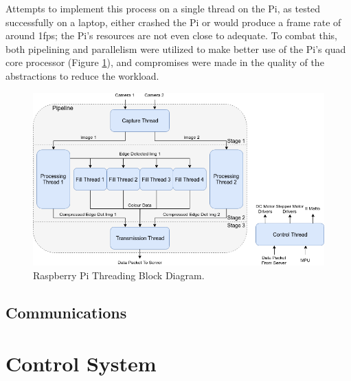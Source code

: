Attempts to implement this process on a single thread on the Pi, as tested successfully on a laptop, either crashed the Pi or would produce a frame rate of around 1fps; the Pi's resources are not even close to adequate. To combat this, both pipelining and parallelism were utilized to make better use of the Pi's quad core processor (Figure \ref{fig:threads}), and compromises were made in the quality of the abstractions to reduce the workload.

\begin{figure}[H]
    \begin{center}
      \includegraphics[width=1\textwidth]{Figures/Threads.png}
      \caption[Raspberry Pi Threading Block Diagram]{Raspberry Pi Threading Block Diagram.}
      \label{fig:threads}
    \end{center}
\end{figure}

\subsection{Communications}
\label{Subsection:comms}

\section{Control System}